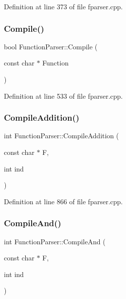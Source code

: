 Definition at line 373 of file fparser.\+cpp.

\mbox{\label{class_function_parser_aa136efc410ad6a9c2992fb6e1c9b057c}} 
\subsubsection{\texorpdfstring{Compile()}{Compile()}}
{\footnotesize\ttfamily bool Function\+Parser\+::\+Compile (\begin{DoxyParamCaption}\item[{const char $\ast$}]{Function }\end{DoxyParamCaption})\hspace{0.3cm}{\ttfamily [private]}}



Definition at line 533 of file fparser.\+cpp.

\mbox{\label{class_function_parser_a9b3024d49f9094731f3cbd17eeea29e5}} 
\subsubsection{\texorpdfstring{Compile\+Addition()}{CompileAddition()}}
{\footnotesize\ttfamily int Function\+Parser\+::\+Compile\+Addition (\begin{DoxyParamCaption}\item[{const char $\ast$}]{F,  }\item[{int}]{ind }\end{DoxyParamCaption})\hspace{0.3cm}{\ttfamily [private]}}



Definition at line 866 of file fparser.\+cpp.

\mbox{\label{class_function_parser_adb0768f374333bbee4c84c30a2769d1b}} 
\subsubsection{\texorpdfstring{Compile\+And()}{CompileAnd()}}
{\footnotesize\ttfamily int Function\+Parser\+::\+Compile\+And (\begin{DoxyParamCaption}\item[{const char $\ast$}]{F,  }\item[{int}]{ind }\end{DoxyParamCaption})\hspace{0.3cm}{\ttfamily [private]}}



